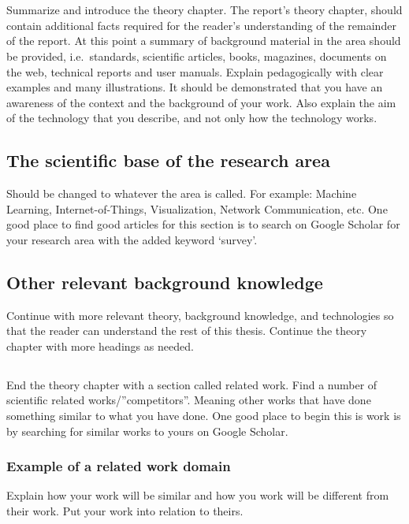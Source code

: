 \section{}\label{sec:theory} 
Summarize and introduce the theory chapter. The report's theory chapter, should
contain additional facts required for the reader's understanding of the
remainder of the report. At this point a summary of background material in the
area should be provided, i.e.\ standards, scientific articles, books, magazines,
documents on the web, technical reports and user manuals. Explain pedagogically
with clear examples and many illustrations. It should be demonstrated that you
have an awareness of the context and the background of your work. Also explain
the aim of the technology that you describe, and not only how the technology
works.

\subsection{The scientific base of the research area}\label{subsec:sciencebase}
Should be changed to whatever the area is called. For example: Machine Learning,
Internet-of-Things, Visualization, Network Communication, etc. One good place to
find good articles for this section is to search on Google Scholar for your
research area with the added keyword ‘survey’.

\subsection{Other relevant background knowledge}\label{subsec:other}
Continue with more relevant theory, background knowledge, and technologies so
that the reader can understand the rest of this thesis.  Continue the theory
chapter with more headings as needed.

\subsection{}\label{subsec:relatedwork} 
End the theory chapter with a section called related work. Find a number of
scientific related works/”competitors”. Meaning other works that have done
something similar to what you have done. One good place to begin this is work is
by searching for similar works to yours on Google Scholar.

\subsubsection{Example of a related work domain}\label{subsubsec:examplerelatedwork}
Explain how your work will be similar and how you work will be different from
their work. Put your work into relation to theirs. 

